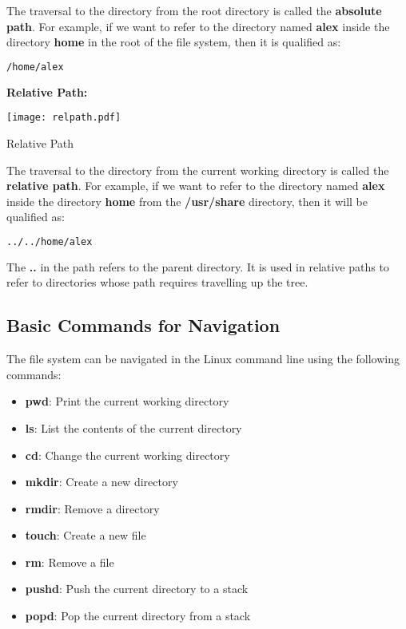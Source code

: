 The traversal to the directory from the root directory is called the \textbf{absolute path}. For example, if we want to refer to the directory named \textbf{alex} inside the directory \textbf{home} in the root of the file system, then it is qualified as:

\begin{lstlisting}[language=bash]
  /home/alex
\end{lstlisting}

\textbf{Relative Path:}

\begin{marginfigure}
	\texttt{[image: relpath.pdf]}
	\caption[Relative Path]{Relative Path}
\end{marginfigure}

The traversal to the directory from the current working directory is called the \textbf{relative path}. For example, if we want to refer to the directory named \textbf{alex} inside the directory \textbf{home} from the \textbf{/usr/share} directory, then it will be qualified as:

\begin{lstlisting}[language=bash]
  ../../home/alex
\end{lstlisting}

\begin{remark}
  The \textbf{..} in the path refers to the parent directory. It is used in relative paths to refer to directories whose path requires travelling up the tree.
\end{remark}

\subsection{Basic Commands for Navigation}
The file system can be navigated in the Linux command line using the following commands:
\begin{itemize}
  \item \textbf{pwd}: Print the current working directory
  \item \textbf{ls}: List the contents of the current directory
  \item \textbf{cd}: Change the current working directory
  \item \textbf{mkdir}: Create a new directory
  \item \textbf{rmdir}: Remove a directory
  \item \textbf{touch}: Create a new file
  \item \textbf{rm}: Remove a file
  \item \textbf{pushd}: Push the current directory to a stack
  \item \textbf{popd}: Pop the current directory from a stack
\end{itemize}

